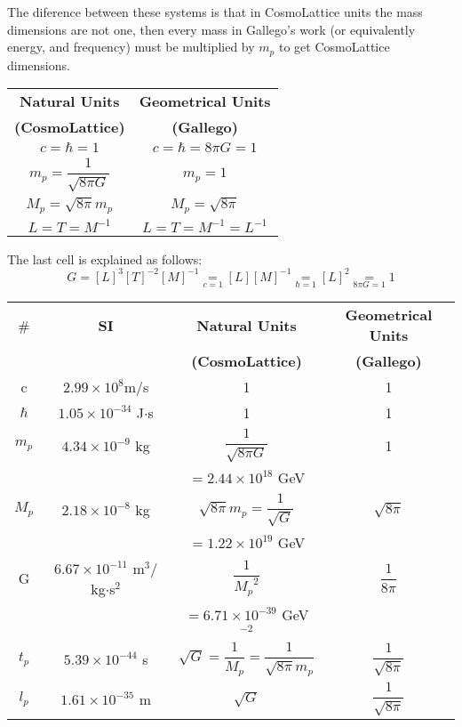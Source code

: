 \documentclass{article}
\begin{document}
The diference between these systems is that in CosmoLattice units the mass dimensions are not one, then every mass in Gallego's work (or equivalently energy, and frequency) must be multiplied by $m_p$ to get CosmoLattice dimensions.
\begin{center}
\begin{tabular}{|c|c|}
    \hline
    \textbf{Natural Units} & \textbf{Geometrical Units} \\
    \textbf{(CosmoLattice)} & \textbf{(Gallego)} \\
    \hline
    $c=\hbar=1$ & $c=\hbar=8\pi G=1$ \\
    \hline
    $m_p=\dfrac{1}{\sqrt{8\pi G}}$ & $m_p=1$ \\
    \hline
    $M_p=\sqrt{8\pi}m_p$ & $M_p=\sqrt{8\pi}$ \\
    \hline
    $L=T=M^{-1}$ & $L=T=M^{-1}=L^{-1}$ \\
    \hline
\end{tabular}
\end{center}
The last cell is explained as follows:
$$G = [L]^3[T]^{-2}[M]^{-1} \underset{c=1}{=} [L][M]^{-1}\underset{\hbar=1}{=}[L]^2\underset{8\pi G=1}{=}1$$



\vspace{0.25cm}



\vspace{0.25cm}
\begin{center}
    
\begin{tabular}{|c|c|c|c|}
    \hline
    \# & \textbf{SI} & \textbf{Natural Units}& \textbf{Geometrical Units} \\ & & \textbf{(CosmoLattice)} & \textbf{(Gallego)} \\
    \hline
    c & $2.99\times10^8$m/s & 1 & 1 \\
    \hline
    $\hbar$ & $1.05\times10^{-34}$ J$\cdot$s & 1 & 1 \\
    \hline
    $m_p$ & $4.34\times10^{-9}$ kg & $\dfrac{1}{\sqrt{8\pi G}}$ & 1 \\
    & & $=2.44\times10^{18}$ GeV& \\
    \hline
    $M_p$ & $2.18\times10^{-8}$ kg & $\sqrt{8\pi}m_p=\dfrac{1}{\sqrt G}$ & $\sqrt{8\pi}$ \\
    & & $=1.22\times10^{19}$ GeV& \\
    \hline
    G & $6.67\times10^{-11}$ m$^3/$kg$\cdot$s$^2$ & $\dfrac{1}{{M_p}^2}$ & $\dfrac{1}{8\pi}$ \\
    & & $=6.71\times10^{-39}$ GeV$^{-2}$ &\\
    \hline
    $t_p$ & $5.39\times10^{-44}$ s & $\sqrt G=\dfrac{1}{M_p}=\dfrac{1}{\sqrt{8\pi} m_p}$ & $\dfrac{1}{\sqrt{8\pi}}$ \\
    \hline
    $l_p$ & $1.61\times10^{-35}$ m& $\sqrt{G}$& $\dfrac{1}{\sqrt{8\pi}}$ \\
    \hline
\end{tabular}
\end{center}
\end{document}
